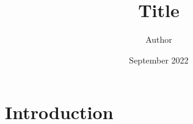\documentclass{apa7}
\title{Title}
\author{Author}
\date{September 2022}
\begin{document}
\maketitle

\newpage

\section{Introduction}
\end{document}
